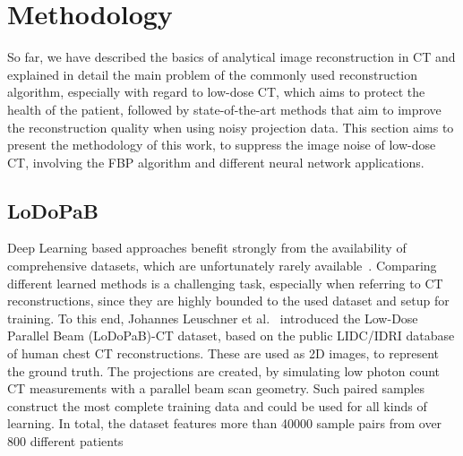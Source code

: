 \documentclass[12pt,a4paper]{article}
\begin{document}
\section{Methodology}
So far, we have described the basics of analytical image reconstruction in CT and explained in detail the main problem of the commonly used reconstruction algorithm, especially with regard to low-dose CT, which aims to protect the health of the patient, followed by state-of-the-art methods that aim to improve the reconstruction quality when using noisy projection data. This section aims to present the methodology of this work, to suppress the image noise of low-dose CT, involving the FBP algorithm and different neural network applications.

\subsection{LoDoPaB}
Deep Learning based approaches benefit strongly from the availability of comprehensive datasets, which are unfortunately rarely available~\cite{leuschner2022lodopab}. Comparing different learned methods is a challenging task, especially when referring to CT reconstructions, since they are highly bounded to the used dataset and setup for training. To this end, Johannes Leuschner et al.~\cite{leuschner2022lodopab} introduced the Low-Dose Parallel Beam (LoDoPaB)-CT dataset,  based on the public LIDC/IDRI database of human chest CT reconstructions. These are used as 2D images, to represent the ground truth. The projections are created, by simulating low photon count CT measurements with a parallel beam scan geometry. Such paired samples construct the most complete training data and could be used for all kinds of learning. In total, the dataset features more than 40000
sample pairs from over 800 different patients
\end{document}
